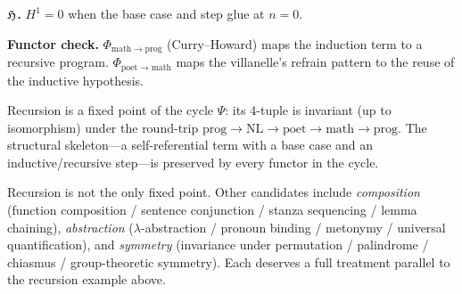 \textbf{$\mathfrak{H}$.}\quad
$H^1=0$ when the base case and step glue at $n=0$.

\textbf{Functor check.}\quad
$\Phi_{\mathrm{math}\to\mathrm{prog}}$ (Curry--Howard)
maps the induction term to a recursive program.
$\Phi_{\mathrm{poet}\to\mathrm{math}}$ maps the
villanelle's refrain pattern to the reuse of the inductive
hypothesis.

\medskip

\begin{theorem}
\label{thm:recursion-universal}
Recursion is a fixed point of the cycle $\Psi$: its 4-tuple
is invariant (up to isomorphism) under the round-trip
$\mathrm{prog}\to\mathrm{NL}\to\mathrm{poet}\to\mathrm{math}
\to\mathrm{prog}$.  The structural skeleton---a self-referential
term with a base case and an inductive/recursive step---is
preserved by every functor in the cycle.
\end{theorem}

\begin{remark}
Recursion is not the only fixed point.  Other candidates include
\emph{composition} (function composition / sentence conjunction /
stanza sequencing / lemma chaining),
\emph{abstraction} ($\lambda$-abstraction / pronoun binding /
metonymy / universal quantification), and
\emph{symmetry} (invariance under permutation / palindrome /
chiasmus / group-theoretic symmetry).  Each deserves a full
treatment parallel to the recursion example above.
\end{remark}
